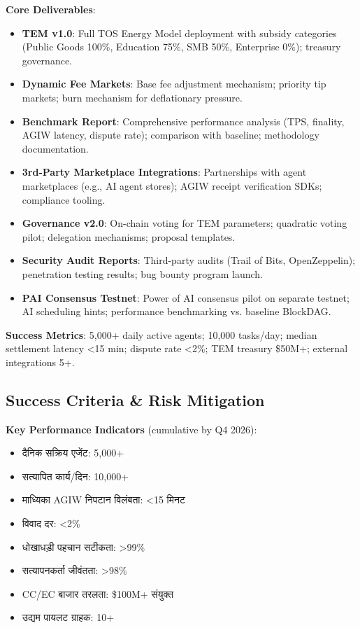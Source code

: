 \documentclass[11pt]{article}
\begin{document}
\begin{itemize}[noitemsep]
\begin{itemize}[noitemsep]
\begin{itemize}[noitemsep]
\begin{itemize}[noitemsep]
\begin{itemize}[noitemsep]
\begin{itemize}[noitemsep]
\textbf{Core Deliverables}:
\begin{itemize}[noitemsep]
  \item \textbf{TEM v1.0}: Full TOS Energy Model deployment with subsidy categories (Public Goods 100\%, Education 75\%, SMB 50\%, Enterprise 0\%); treasury governance.
  \item \textbf{Dynamic Fee Markets}: Base fee adjustment mechanism; priority tip markets; burn mechanism for deflationary pressure.
  \item \textbf{Benchmark Report}: Comprehensive performance analysis (TPS, finality, AGIW latency, dispute rate); comparison with baseline; methodology documentation.
  \item \textbf{3rd-Party Marketplace Integrations}: Partnerships with agent marketplaces (e.g., AI agent stores); AGIW receipt verification SDKs; compliance tooling.
  \item \textbf{Governance v2.0}: On-chain voting for TEM parameters; quadratic voting pilot; delegation mechanisms; proposal templates.
  \item \textbf{Security Audit Reports}: Third-party audits (Trail of Bits, OpenZeppelin); penetration testing results; bug bounty program launch.
  \item \textbf{PAI Consensus Testnet}: Power of AI consensus pilot on separate testnet; AI scheduling hints; performance benchmarking vs. baseline BlockDAG.
\end{itemize}

\textbf{Success Metrics}: 5,000+ daily active agents; 10,000 tasks/day; median settlement latency <15 min; dispute rate <2\%; TEM treasury \$50M+; external integrations 5+.

\subsection{Success Criteria \& Risk Mitigation}

\textbf{Key Performance Indicators} (cumulative by Q4 2026):
\begin{itemize}[noitemsep]
  \item दैनिक सक्रिय एजेंट: 5,000+
  \item सत्यापित कार्य/दिन: 10,000+
  \item माध्यिका AGIW निपटान विलंबता: <15 मिनट
  \item विवाद दर: <2\%
  \item धोखाधड़ी पहचान सटीकता: >99\%
  \item सत्यापनकर्ता जीवंतता: >98\%
  \item CC/EC बाजार तरलता: \$100M+ संयुक्त
  \item उद्यम पायलट ग्राहक: 10+
\end{itemize}


\end{itemize}
\end{itemize}
\end{itemize}
\end{itemize}
\end{itemize}
\end{itemize}
\end{document}
